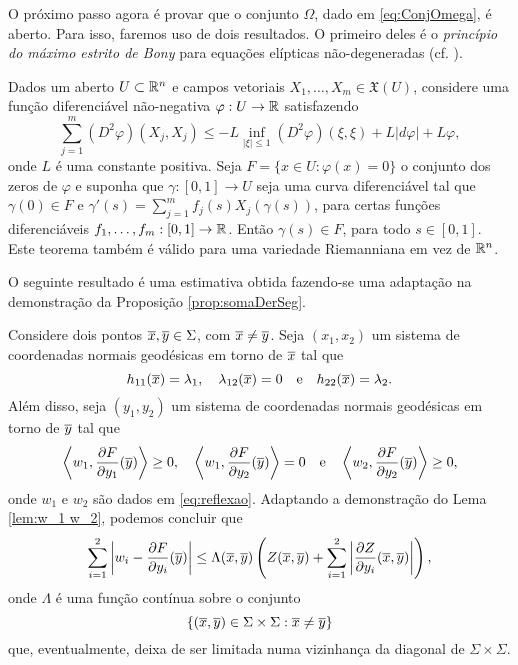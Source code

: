 O pr\'oximo passo agora \'e provar que o conjunto $\Omega$,
dado em \eqref{eq:ConjOmega}, \'e aberto. Para isso, faremos
uso de dois resultados. O primeiro deles \'e o {\em princ\'ipio
do m\'aximo estrito de Bony} para equa\c c\~oes el\'ipticas 
n\~ao-degeneradas (cf. \cite[Corollary 9.7]{Brendle2010}).

\begin{teorema} \label{teo:bony}
Dados um aberto $U\subset\mathbb{R}^n$ e campos vetoriais 
$X_1,\ldots,X_m\in\mathfrak{X}(U)$, considere uma fun\c c\~ao
diferenci\'avel n\~ao-negativa $\varphi:U\to\mathbb{R}$ satisfazendo
\begin{equation*}
\sum_{j=1}^{m} (D^2 \varphi)(X_j,X_j) \leq -L \inf_{|\xi| \leq 1} 
(D^2 \varphi)(\xi,\xi) + L |d \varphi| + L \varphi,
\end{equation*}
onde $L$ é uma constante positiva. Seja $F=\{x\in U:\varphi(x)=0\}$
o conjunto dos zeros de $\varphi$ e suponha que $\gamma:[0,1]\to U$
seja uma curva diferenciável tal que $\gamma(0)\in F$ e 
$\gamma'(s) = \displaystyle\sum_{j=1}^{m} f_j(s) X_j(\gamma(s))$, para certas
funções diferenciáveis $f_1,\ldots,f_m:[0,1]\to\mathbb{R}$. Então 
$\gamma(s)\in F$, para todo $s\in[0,1]$.
Este teorema também é válido para uma variedade Riemanniana em vez de $\mathbb{R}^n$.
\end{teorema}

O seguinte resultado \'e uma estimativa obtida fazendo-se uma
adapta\c c\~ao na demonstra\c c\~ao da Proposi\c c\~ao
\ref{prop:somaDerSeg}.

Considere dois pontos $\overline{x},\overline{y}\in\Sigma$, com $\overline{x}\neq\overline{y}$. Seja
$(x_1,x_2)$ um sistema de coordenadas normais geod\'esicas em
torno de $\overline{x}$ tal que
\[
h_{11}(\overline{x})=\lambda_1, \quad \lambda_{12}(\overline{x})=0
\quad\mbox{e}\quad h_{22}(\overline{x})=\lambda_2. 
\]
Al\'em disso, seja $(y_1,y_2)$ um sistema de coordenadas normais 
geod\'esicas em torno de $\overline{y}$ tal que
\begin{equation*}
\left\langle w_1, \frac{\partial F}{\partial y_1}(\overline{y}) \right\rangle \geq 0, 
\quad 
\left\langle w_1, \frac{\partial F}{\partial y_2}(\overline{y}) \right\rangle = 0 
\quad \text{e} \quad 
\left\langle w_2, \frac{\partial F}{\partial y_2}(\overline{y}) \right\rangle \geq 0,
\end{equation*}
onde $w_1$ e $w_2$ s\~ao dados em \eqref{eq:reflexao}. Adaptando
a demonstra\c c\~ao do Lema \ref{lem:w_1 w_2}, podemos concluir
que
\[
\sum_{i=1}^2\left| w_i-\frac{\partial F}{\partial y_i}(\overline{y})\right| \leq
\Lambda(\overline{x},\overline{y})\left(Z(\overline{x},\overline{y})+\sum_{i=1}^2
\left|\frac{\partial Z}{\partial y_i}(\overline{x},\overline{y})\right|\right),
\]
onde $\Lambda$ \'e uma fun\c c\~ao cont\'inua sobre o conjunto
\[
\{(\overline{x},\overline{y})\in\Sigma\times\Sigma:\overline{x}\neq\overline{y}\}
\]
que, eventualmente, deixa de ser limitada numa vizinhan\c ca
da diagonal de $\Sigma\times\Sigma$. 

